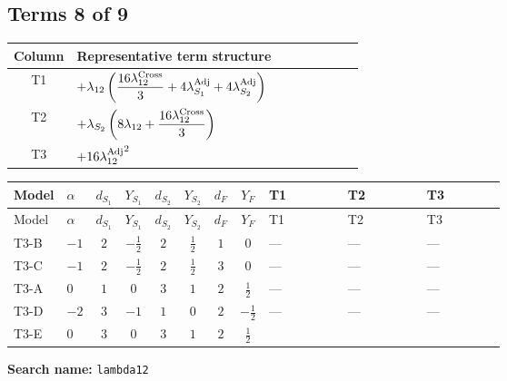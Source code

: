 \documentclass[8pt]{article}
\begin{document}
\begin{landscape}
\subsection*{Terms 8 of 9}
\begin{center}
\begin{tabular}{@{}c >{\raggedright\arraybackslash}p{0.82\linewidth}@{}}
\toprule
Column & Representative term structure \\
\midrule
T1 & \(\displaystyle +{\lambda_{12}} \left(\frac{16 {\lambda_{12}^{\rm Cross}}}{3}+4 {\lambda_{S_1}^{\rm Adj}}+4 {\lambda_{S_2}^{\rm Adj}}\right)\) \\
\midrule
T2 & \(\displaystyle +{\lambda_{S_2}} \left(8 {\lambda_{12}}+\frac{16 {\lambda_{12}^{\rm Cross}}}{3}\right)\) \\
\midrule
T3 & \(\displaystyle +16 {\lambda_{12}^{\rm Adj}}^2\) \\
\midrule
\bottomrule
\end{tabular}
\end{center}
\smallskip
\tiny
\begin{longtable}{@{}llcccccc >{\raggedright\arraybackslash}p{0.21\linewidth} >{\raggedright\arraybackslash}p{0.21\linewidth} >{\raggedright\arraybackslash}p{0.21\linewidth}@{}}
\toprule
Model & $\alpha$ & $d_{S_1}$ & $Y_{S_1}$ & $d_{S_2}$ & $Y_{S_2}$ & $d_F$ & $Y_F$ & T1 & T2 & T3 \\
\midrule
\endfirsthead
\toprule
Model & $\alpha$ & $d_{S_1}$ & $Y_{S_1}$ & $d_{S_2}$ & $Y_{S_2}$ & $d_F$ & $Y_F$ & T1 & T2 & T3 \\
\midrule
\endhead
T3-B & $-1$ & $2$ & $-\frac{1}{2}$ & $2$ & $\frac{1}{2}$ & $1$ & $0$ & --- & --- & --- \\
\midrule
T3-C & $-1$ & $2$ & $-\frac{1}{2}$ & $2$ & $\frac{1}{2}$ & $3$ & $0$ & --- & --- & --- \\
\midrule
T3-A & $0$ & $1$ & $0$ & $3$ & $1$ & $2$ & $\frac{1}{2}$ & --- & --- & --- \\
\midrule
T3-D & $-2$ & $3$ & $-1$ & $1$ & $0$ & $2$ & $-\frac{1}{2}$ & --- & --- & --- \\
\midrule
T3-E & $0$ & $3$ & $0$ & $3$ & $1$ & $2$ & $\frac{1}{2}$ & \scriptsize\adjustbox{max width=\linewidth}{$\begin{gathered} +{\lambda_{12}} \left(\frac{16 {\lambda_{12}^{\rm Cross}}}{3}+4 {\lambda_{S_1}^{\rm Adj}}+4 {\lambda_{S_2}^{\rm Adj}}\right)\end{gathered}$} & \scriptsize\adjustbox{max width=\linewidth}{$\begin{gathered} +{\lambda_{S_2}} \left(8 {\lambda_{12}}+\frac{16 {\lambda_{12}^{\rm Cross}}}{3}\right)\end{gathered}$} & \scriptsize\adjustbox{max width=\linewidth}{$\begin{gathered} +16 {\lambda_{12}^{\rm Adj}}^2\end{gathered}$} \\
\midrule
\bottomrule
\end{longtable}
\clearpage
\noindent\textbf{Search name: }\texttt{lambda12}\par\smallskip

\end{landscape}
\end{document}
